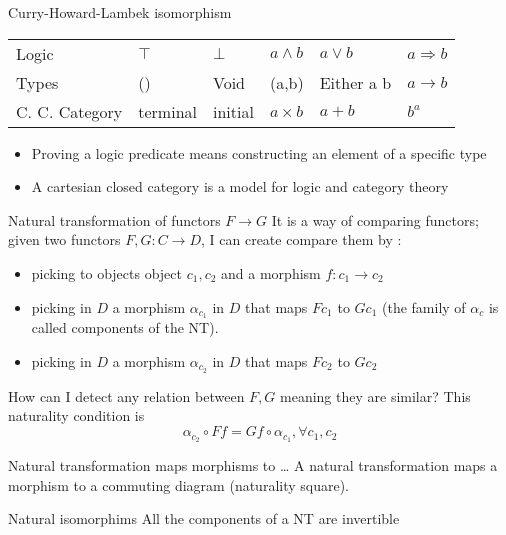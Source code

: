 \documentclass[presentation]{beamer}
\begin{document}
\begin{frame}[label={sec:org788b71a}]{Curry-Howard-Lambek isomorphism}
\begin{center}
\begin{tabular}{llllll}
\alert{Logic} & \(\top\) & \(\bot\) & \(a \wedge b\) & \(a \vee b\) & \(a \Rightarrow b\)\\
\alert{Types} & () & Void & (a,b) & Either a b & \(a \rightarrow b\)\\
\alert{C. C. Category} & terminal & initial & \(a \times b\) & \(a + b\) & \(b^a\)\\
\end{tabular}
\end{center}

\begin{itemize}
\item Proving a logic predicate means constructing an element of a specific type

\item A cartesian closed category is a model for logic and category theory
\end{itemize}
\end{frame}
\begin{frame}[label={sec:orgaccad44}]{Natural transformation of functors \(F \rightarrow G\)}
It is a way of comparing functors; given two functors \(F,G: C \rightarrow D\), I
can create compare them by :
\begin{itemize}
\item picking to objects object \(c_1,c_2\) and a morphism \(f: c_1 \rightarrow c_2\)
\item picking in \(D\) a morphism \(\alpha_{c_1}\) in \(D\) that maps \(Fc_1\) to \(Gc_1\)
(the family of \(\alpha_c\) is called \alert{components of the NT}).
\item picking in \(D\) a morphism \(\alpha_{c_2}\) in \(D\) that maps \(Fc_2\) to \(Gc_2\)
\end{itemize}
How can I detect any relation between \(F,G\) meaning they are similar? This
naturality condition is $$\alpha_{c_2} \circ F f = G f \circ \alpha_{c_1},
    \forall c_1,c_2$$
\end{frame}

\begin{frame}[label={sec:org9258177}]{Natural transformation maps morphisms to \ldots{}}
A natural transformation maps a morphism to a commuting diagram (\alert{naturality
square}).
\end{frame}

\begin{frame}[label={sec:org5e71652}]{Natural isomorphims}
All the components of a NT are invertible
\end{frame}
\end{document}
